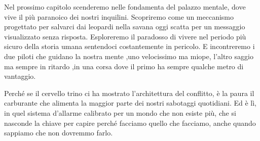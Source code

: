 Nel prossimo capitolo scenderemo nelle fondamenta del palazzo mentale, dove vive il più paranoico dei nostri inquilini. Scopriremo come un meccanismo progettato per salvarci dai leopardi nella savana oggi scatta per un messaggio visualizzato senza risposta. Esploreremo il paradosso di vivere nel periodo più sicuro della storia umana sentendoci costantemente in pericolo. E incontreremo i due piloti che guidano la nostra mente ,uno velocissimo ma miope, l'altro saggio ma sempre in ritardo ,in una corsa dove il primo ha sempre qualche metro di vantaggio.

Perché se il cervello trino ci ha mostrato l'architettura del conflitto, è la paura il carburante che alimenta la maggior parte dei nostri sabotaggi quotidiani. Ed è lì, in quel sistema d'allarme calibrato per un mondo che non esiste più, che si nasconde la chiave per capire perché facciamo quello che facciamo, anche quando sappiamo che non dovremmo farlo.

